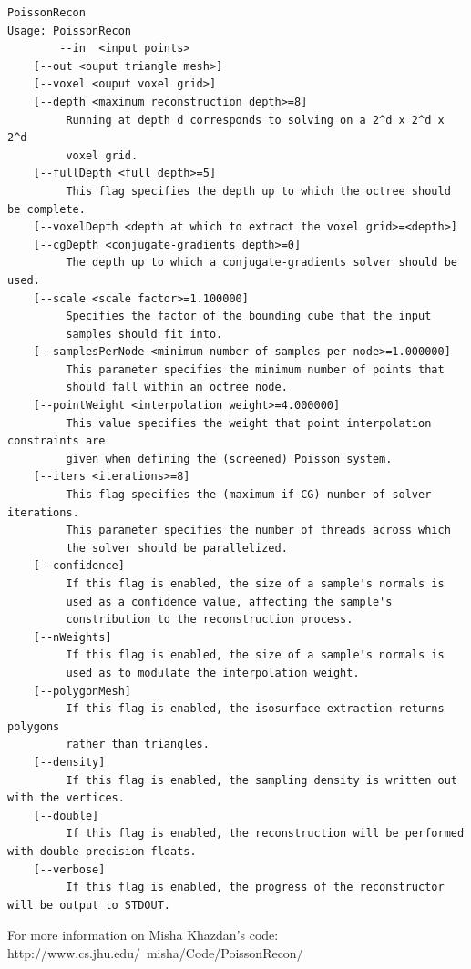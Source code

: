 \begin{verbatim}
PoissonRecon
Usage: PoissonRecon
        --in  <input points>
	[--out <ouput triangle mesh>]
	[--voxel <ouput voxel grid>]
	[--depth <maximum reconstruction depth>=8]
		 Running at depth d corresponds to solving on a 2^d x 2^d x 2^d
		 voxel grid.
	[--fullDepth <full depth>=5]
		 This flag specifies the depth up to which the octree should be complete.
	[--voxelDepth <depth at which to extract the voxel grid>=<depth>]
	[--cgDepth <conjugate-gradients depth>=0]
		 The depth up to which a conjugate-gradients solver should be used.
	[--scale <scale factor>=1.100000]
		 Specifies the factor of the bounding cube that the input
		 samples should fit into.
	[--samplesPerNode <minimum number of samples per node>=1.000000]
		 This parameter specifies the minimum number of points that
		 should fall within an octree node.
	[--pointWeight <interpolation weight>=4.000000]
		 This value specifies the weight that point interpolation constraints are
		 given when defining the (screened) Poisson system.
	[--iters <iterations>=8]
		 This flag specifies the (maximum if CG) number of solver iterations.
		 This parameter specifies the number of threads across which
		 the solver should be parallelized.
	[--confidence]
		 If this flag is enabled, the size of a sample's normals is
		 used as a confidence value, affecting the sample's
		 constribution to the reconstruction process.
	[--nWeights]
		 If this flag is enabled, the size of a sample's normals is
		 used as to modulate the interpolation weight.
	[--polygonMesh]
		 If this flag is enabled, the isosurface extraction returns polygons
		 rather than triangles.
	[--density]
		 If this flag is enabled, the sampling density is written out with the vertices.
	[--double]
		 If this flag is enabled, the reconstruction will be performed with double-precision floats.
	[--verbose]
		 If this flag is enabled, the progress of the reconstructor will be output to STDOUT.
\end{verbatim}
For more information on Misha Khazdan's code: http://www.cs.jhu.edu/~misha/Code/PoissonRecon/

